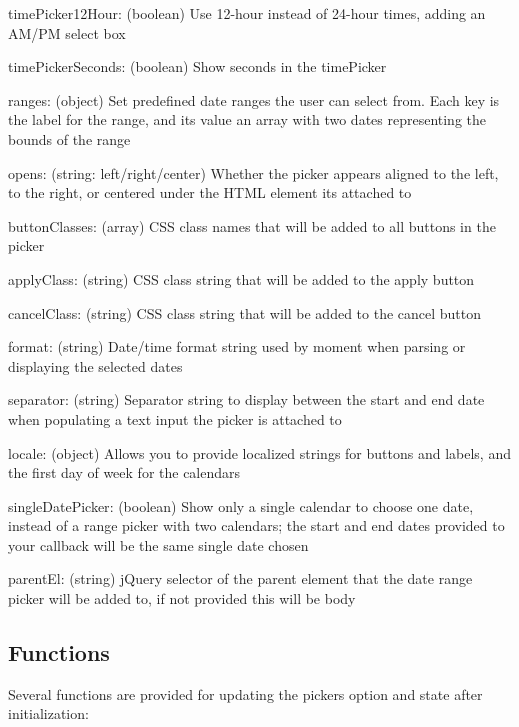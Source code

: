 {\ttfamily time\+Picker12\+Hour}\+: (boolean) Use 12-\/hour instead of 24-\/hour times, adding an A\+M/\+PM select box

{\ttfamily time\+Picker\+Seconds}\+: (boolean) Show seconds in the time\+Picker

{\ttfamily ranges}\+: (object) Set predefined date ranges the user can select from. Each key is the label for the range, and its value an array with two dates representing the bounds of the range

{\ttfamily opens}\+: (string\+: \textquotesingle{}left\textquotesingle{}/\textquotesingle{}right\textquotesingle{}/\textquotesingle{}center\textquotesingle{}) Whether the picker appears aligned to the left, to the right, or centered under the H\+T\+ML element it\textquotesingle{}s attached to

{\ttfamily button\+Classes}\+: (array) C\+SS class names that will be added to all buttons in the picker

{\ttfamily apply\+Class}\+: (string) C\+SS class string that will be added to the apply button

{\ttfamily cancel\+Class}\+: (string) C\+SS class string that will be added to the cancel button

{\ttfamily format}\+: (string) Date/time format string used by moment when parsing or displaying the selected dates

{\ttfamily separator}\+: (string) Separator string to display between the start and end date when populating a text input the picker is attached to

{\ttfamily locale}\+: (object) Allows you to provide localized strings for buttons and labels, and the first day of week for the calendars

{\ttfamily single\+Date\+Picker}\+: (boolean) Show only a single calendar to choose one date, instead of a range picker with two calendars; the start and end dates provided to your callback will be the same single date chosen

{\ttfamily parent\+El}\+: (string) j\+Query selector of the parent element that the date range picker will be added to, if not provided this will be {\ttfamily \textquotesingle{}body\textquotesingle{}}

\subsection*{Functions}

Several functions are provided for updating the picker\textquotesingle{}s option and state after initialization\+:

